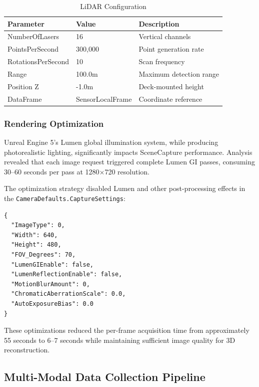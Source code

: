 \begin{table}[htbp]
\centering
\caption{LiDAR Configuration}
\label{tab:lidar_config}
\begin{tabular}{@{}lll@{}}
\toprule
\textbf{Parameter} & \textbf{Value} & \textbf{Description} \\
\midrule
NumberOfLasers & 16 & Vertical channels \\
PointsPerSecond & 300,000 & Point generation rate \\
RotationsPerSecond & 10 & Scan frequency \\
Range & 100.0m & Maximum detection range \\
Position Z & -1.0m & Deck-mounted height \\
DataFrame & SensorLocalFrame & Coordinate reference \\
\bottomrule
\end{tabular}
\end{table}

\subsubsection{Rendering Optimization}

Unreal Engine 5's Lumen global illumination system, while producing photorealistic lighting, significantly impacts SceneCapture performance. Analysis revealed that each image request triggered complete Lumen GI passes, consuming 30--60 seconds per pass at 1280$\times$720 resolution.

The optimization strategy disabled Lumen and other post-processing effects in the \texttt{CameraDefaults.CaptureSettings}:

\begin{lstlisting}[language={}, caption={Optimized Capture Settings}]
{
  "ImageType": 0,
  "Width": 640,
  "Height": 480,
  "FOV_Degrees": 70,
  "LumenGIEnable": false,
  "LumenReflectionEnable": false,
  "MotionBlurAmount": 0,
  "ChromaticAberrationScale": 0.0,
  "AutoExposureBias": 0.0
}
\end{lstlisting}

These optimizations reduced the per-frame acquisition time from approximately 55 seconds to 6--7 seconds while maintaining sufficient image quality for 3D reconstruction.

\subsection{Multi-Modal Data Collection Pipeline}

